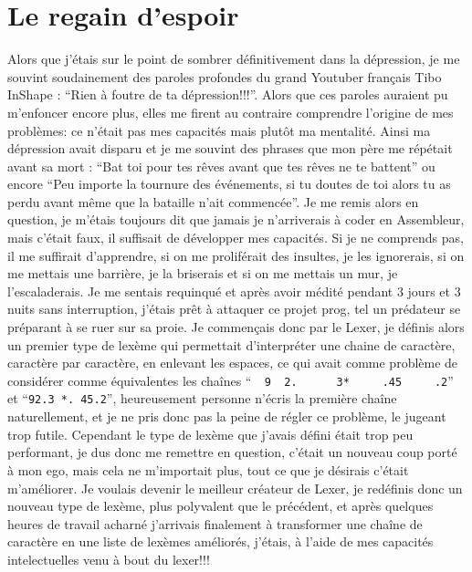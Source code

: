 \documentclass{report}
\begin{document}
\section{Le regain d'espoir}
Alors que j'étais sur le point de sombrer définitivement dans la dépression, je me souvint soudainement des paroles profondes du grand Youtuber français Tibo InShape : ``Rien à foutre de ta dépression!!!''. Alors que ces paroles auraient pu m'enfoncer encore plus, elles me firent au contraire comprendre l'origine de mes problèmes: ce n'était pas mes capacités mais plutôt ma mentalité. Ainsi ma dépression avait disparu et je me souvint des phrases que mon père me répétait avant sa mort : ``Bat toi pour tes rêves avant que tes rêves ne te battent'' ou encore ``Peu importe la tournure des événements, si tu doutes de toi alors tu as perdu avant même que la bataille n'ait commencée''. Je me remis alors en question, je m'étais toujours dit que jamais je n'arriverais à coder en Assembleur, mais c'était faux, il suffisait de développer mes capacités. Si je ne comprends pas, il me suffirait d'apprendre, si on me proliférait des insultes,  je les ignorerais, si on me mettais une barrière, je la briserais et si on me mettais un mur, je l'escaladerais. Je me sentais requinqué et après avoir médité pendant 3 jours et 3 nuits sans interruption, j'étais prêt à attaquer ce projet prog, tel un prédateur se préparant à se ruer sur sa proie. 
Je commençais donc par le Lexer, je définis alors un premier type de lexème qui permettait d'interpréter une chaine de caractère, caractère par caractère, en enlevant les espaces, ce qui avait comme problème de considérer comme équivalentes les chaînes ``\verb|  9  2.      3*     .45     .2|'' et ``\verb|92.3 *. 45.2|'', heureusement personne n'écris la première chaîne naturellement, et je ne pris donc pas la peine de régler ce problème, le jugeant trop futile. Cependant le type de lexème que j'avais défini était trop peu performant, je dus donc me remettre en question, c'était un nouveau coup porté à mon ego, mais cela ne m'importait plus, tout ce que je désirais c'était m'améliorer. Je voulais devenir le meilleur créateur de Lexer, je redéfinis donc un nouveau type de lexème, plus polyvalent que le précédent, et après quelques heures de travail acharné j'arrivais finalement à transformer une chaîne de caractère en une liste de lexèmes améliorés, j'étais, à l'aide de mes capacités intelectuelles venu à bout du lexer!!!
\end{document}
